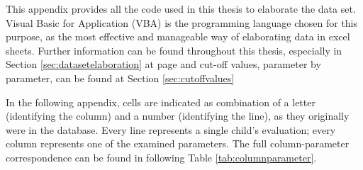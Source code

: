 \label{chap:appendixvbaexpressions}
This appendix provides all the code used in this thesis to elaborate the data set. Visual Basic for Application (VBA) is the programming language chosen for this purpose, as the most effective and manageable way of elaborating data in excel sheets. Further information can be found throughout this thesis, especially in Section \ref{sec:datasetelaboration} at page \pageref{sec:datasetelaboration} and cut-off values, parameter by parameter, can be found at Section \ref{sec:cutoffvalues}

In the following appendix, cells are indicated as combination of a letter (identifying the column) and a number (identifying the line), as they originally were in the database. Every line represents a single child's evaluation; every column represents one of the examined parameters. The full column-parameter correspondence can be found in following Table \ref{tab:columnparameter}.

\newlength\mylength
\setlength\mylength{\dimexpr\textwidth-5\arrayrulewidth-8\tabcolsep}

